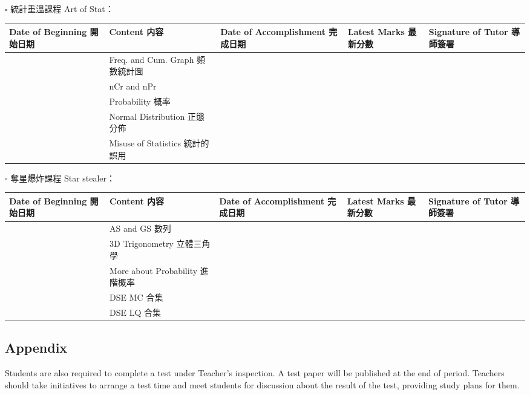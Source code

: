\documentclass{article}
\begin{document}
    $\square$ 統計重溫課程 Art of Stat：
    \begin{center}
        \begin{tabular}{|m{3cm}|m{5cm}|m{4cm}|m{2cm}|m{2cm}|}
            \hline
            Date of Beginning 開始日期&Content 内容&Date of Accomplishment 完成日期&Latest Marks 最新分數&Signature of Tutor 導師簽署\\
            \hline
            &Freq. and Cum. Graph 頻數統計圖&&&\\
            \hline
            &nCr and nPr&&&\\
            \hline
            &Probability 概率&&&\\
            \hline
            &Normal Distribution 正態分佈&&&\\
            \hline
            &Misuse of Statistics 統計的誤用&&&\\
            \hline
        \end{tabular}
    \end{center}

    $\square$ 奪星爆炸課程 Star stealer：
    \begin{center}
        \begin{tabular}{|m{3cm}|m{5cm}|m{4cm}|m{2cm}|m{2cm}|}
            \hline
            Date of Beginning 開始日期&Content 内容&Date of Accomplishment 完成日期&Latest Marks 最新分數&Signature of Tutor 導師簽署\\
            \hline
            &AS and GS 數列&&&\\
            \hline
            &3D Trigonometry 立體三角學&&&\\
            \hline
            &More about Probability 進階概率&&&\\
            \hline
            &DSE MC 合集&&&\\
            \hline
            &DSE LQ 合集&&&\\
            \hline
        \end{tabular}
    \end{center}

    \subsection*{Appendix}

    Students are also required to complete a test under Teacher's inspection. A test paper will be published at the end of period. Teachers should take initiatives to arrange a test time and meet students for discussion about the result of the test, providing study plans for them.
\end{document}
